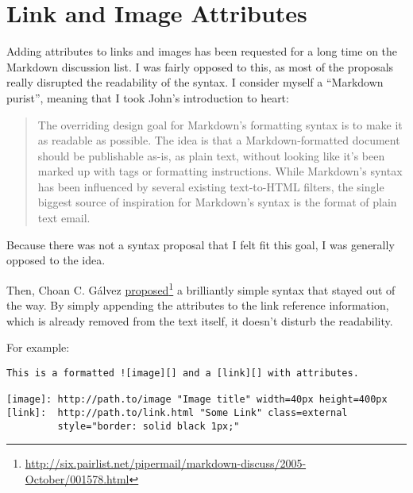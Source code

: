 
\def\mytitle{Link and Image Attributes}
\def\myauthor{Fletcher T. Penney}
\def\revised{2018-06-30}




\tableofcontents

\section{Link and Image Attributes }
\label{linkandimageattributes}

Adding attributes to links and images has been requested for a long time on
the Markdown discussion list. I was fairly opposed to this, as most of the
proposals really disrupted the readability of the syntax. I consider myself a
``Markdown purist'', meaning that I took John's introduction to heart:

\begin{quote}
The overriding design goal for Markdown's formatting syntax is to make
it as readable as possible. The idea is that a Markdown-formatted
document should be publishable as-is, as plain text, without looking
like it's been marked up with tags or formatting instructions. While
Markdown's syntax has been influenced by several existing text-to-HTML
filters, the single biggest source of inspiration for Markdown's
syntax is the format of plain text email.
\end{quote}

Because there was not a syntax proposal that I felt fit this goal, I was generally opposed to the idea.

Then, Choan C. Gálvez \href{http://six.pairlist.net/pipermail/markdown-discuss/2005-October/001578.html}{proposed}\footnote{\href{http://six.pairlist.net/pipermail/markdown-discuss/2005-October/001578.html}{http:\slash \slash six.pairlist.net\slash pipermail\slash markdown-discuss\slash 2005-October\slash 001578.html}} a brilliantly simple syntax that
stayed out of the way. By simply appending the attributes to the link
reference information, which is already removed from the text itself, it
doesn't disturb the readability.

For example:

\begin{verbatim}
This is a formatted ![image][] and a [link][] with attributes.

[image]: http://path.to/image "Image title" width=40px height=400px
[link]:  http://path.to/link.html "Some Link" class=external
         style="border: solid black 1px;"
\end{verbatim}

